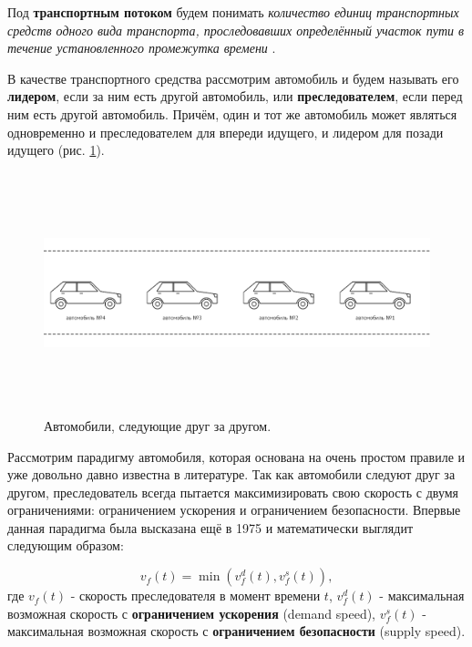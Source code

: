 \documentclass[12pt, a4paper]{extarticle}
\numberwithin{equation}{section}
\begin{document}
Под \textbf{транспортным потоком} будем понимать {\it количество единиц транспортных средств одного вида транспорта, проследовавших определённый участок пути в течение установленного промежутка времени} \cite{TrafficFlow}.

В качестве транспортного средства рассмотрим автомобиль и будем называть его \textbf{лидером}, если за ним есть другой автомобиль, или \textbf{преследователем}, если перед ним есть другой автомобиль. Причём, один и тот же автомобиль может являться одновременно и преследователем для впереди идущего, и лидером для позади идущего (рис. \ref{car_following}). 

\begin{figure}[h!]  
	\begin{center}
		\includegraphics[keepaspectratio,width=160mm,height=70mm]{Images/car_following.png}
	\end{center}
	\caption{Автомобили, следующие друг за другом.}
	\label{car_following}
\end{figure}

Рассмотрим парадигму автомобиля, которая основана на очень простом правиле и уже довольно давно известна в литературе. Так как автомобили следуют друг за другом, преследователь всегда пытается максимизировать свою скорость с двумя ограничениями: ограничением ускорения и ограничением безопасности. Впервые данная парадигма была высказана ещё в 1975 \cite{GippsModel} и математически выглядит следующим образом:

\begin{equation} \label{following_paradigm}
v_f(t) = \min(v_f^d(t), v_f^s(t)),
\end{equation}
где $v_f(t)$ - скорость преследователя в момент времени $t$, $v_f^d(t)$ - максимальная возможная скорость с \textbf{ограничением ускорения} (demand speed), $v_f^s(t)$ - максимальная возможная скорость с \textbf{ограничением безопасности} (supply speed).
\end{document}
